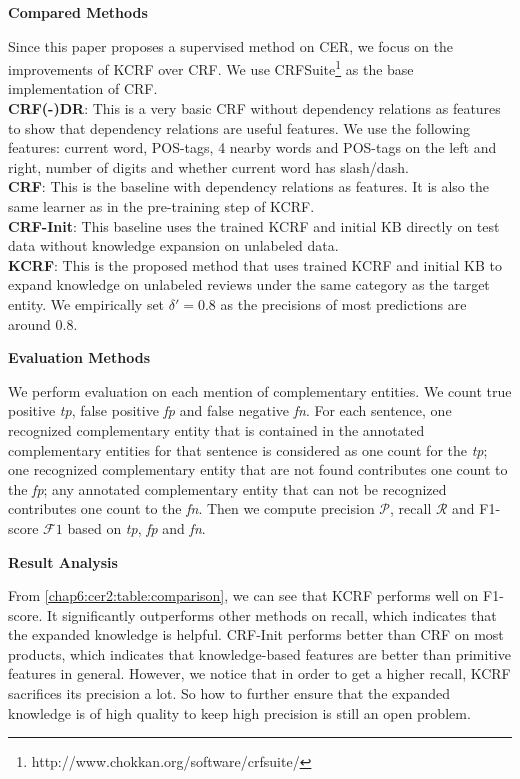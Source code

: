 \textbf{Compared Methods}

Since this paper proposes a supervised method on CER, we focus on the improvements of KCRF over CRF. We use CRFSuite\footnote{http://www.chokkan.org/software/crfsuite/} as the base implementation of CRF.\\
\textbf{CRF(-)DR}: This is a very basic CRF without dependency relations as features to show that dependency relations are useful features. We use the following features: current word, POS-tags, 4 nearby words and POS-tags on the left and right, number of digits and whether current word has slash/dash.\\
\textbf{CRF}: This is the baseline with dependency relations as features. It is also the same learner as in the pre-training step of KCRF.\\  
\textbf{CRF-Init}: This baseline uses the trained KCRF and initial KB directly on test data without knowledge expansion on unlabeled data.\\
\textbf{KCRF}: This is the proposed method that uses trained KCRF and initial KB to expand knowledge on unlabeled reviews under the same category as the target entity. We empirically set $\delta'=0.8$ as the precisions of most predictions are around 0.8. 

\textbf{Evaluation Methods}

We perform evaluation on each mention of complementary entities. We count true positive \textit{tp}, false positive \textit{fp} and false negative \textit{fn}. For each sentence, one recognized complementary entity that is contained in the annotated complementary entities for that sentence is considered as one count for the \textit{tp}; one recognized complementary entity that are not found contributes one count to the \textit{fp}; any annotated complementary entity that can not be recognized contributes one count to the \textit{fn}. Then we compute precision $\mathcal P$, recall $\mathcal R$ and F1-score $\mathcal F1$ based on \textit{tp}, \textit{fp} and \textit{fn}.

\textbf{Result Analysis}

From \ref{chap6:cer2:table:comparison}, we can see that KCRF performs well on F1-score. It significantly outperforms other methods on recall, which indicates that the expanded knowledge is helpful. CRF-Init performs better than CRF on most products, which indicates that knowledge-based features are better than primitive features in general. However, we notice that in order to get a higher recall, KCRF sacrifices its precision a lot. So how to further ensure that the expanded knowledge is of high quality to keep high precision is still an open problem. 

